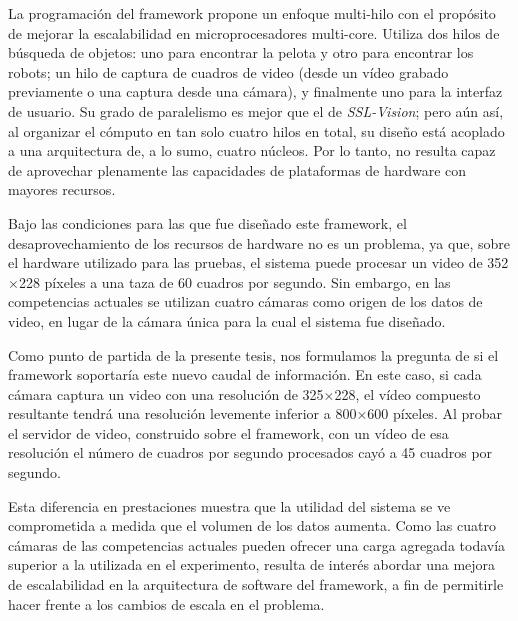 La programación del framework propone un enfoque multi-hilo con el propósito de
mejorar la escalabilidad en microprocesadores multi-core. Utiliza dos hilos de
búsqueda de objetos: uno para encontrar la pelota y otro para encontrar los
robots; un hilo de captura de cuadros de video (desde un vídeo grabado
previamente o una captura desde una cámara), y finalmente uno para la interfaz
de usuario. Su grado de paralelismo es mejor que el de \emph{SSL-Vision}; pero
aún así, al organizar el cómputo en tan solo cuatro hilos en total, su diseño
está acoplado a una arquitectura de, a lo sumo, cuatro núcleos. Por lo tanto, no
resulta capaz de aprovechar plenamente las capacidades de plataformas de
hardware con mayores recursos.

Bajo las condiciones para las que fue diseñado este framework, el
desaprovechamiento de los recursos de hardware no es un problema, ya que, sobre
el hardware utilizado para las pruebas, el sistema puede procesar un video de
352$\times$228 píxeles a una taza de 60 cuadros por segundo. Sin embargo, en las
competencias actuales se utilizan cuatro cámaras como origen de los datos de
video, en lugar de la cámara única para la cual el sistema fue diseñado.

Como punto de partida de la presente tesis, nos formulamos la pregunta de si el
framework soportaría este nuevo caudal de información. En este caso, si cada
cámara captura un video con una resolución de 325$\times$228, el vídeo compuesto
resultante tendrá una resolución levemente inferior a 800$\times$600 píxeles.
Al probar el servidor de video, construido sobre el framework, con un vídeo de
esa resolución el número de cuadros por segundo procesados cayó a 45 cuadros por
segundo.

Esta diferencia en prestaciones muestra que la utilidad del sistema se ve
comprometida a medida que el volumen de los datos aumenta. Como las cuatro
cámaras de las competencias actuales pueden ofrecer una carga agregada todavía
superior a la utilizada en el experimento, resulta de interés abordar una mejora
de escalabilidad en la arquitectura de software del framework, a fin de
permitirle hacer frente a los cambios de escala en el problema.
